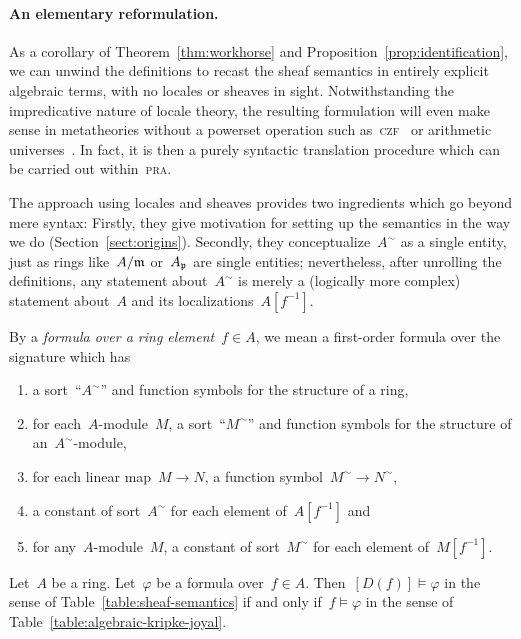 \documentclass{ws-rv9x6}
\begin{document}
{\paragraph{An elementary reformulation.}
As a corollary of Theorem~\ref{thm:workhorse} and
Proposition~\ref{prop:identification}, we can unwind the definitions to recast
the sheaf semantics in entirely explicit algebraic terms, with no locales or
sheaves in sight. Notwithstanding the impredicative nature of locale theory,
the resulting formulation will even make sense in metatheories without a
powerset operation such as~\textsc{czf}~\cite{crosilla:predicativity,aczel-rathjen:cst} or arithmetic
universes~\cite{maietti:au,vickers:sketches}. In
fact, it is then a purely syntactic translation procedure which can be carried
out within~\textsc{pra}.

The approach using locales and sheaves provides two ingredients which go beyond
mere syntax: Firstly, they give motivation for setting up the semantics in
the way we do (Section~\ref{sect:origins}). Secondly, they
conceptualize~$A^\sim$ as a single entity, just as rings like~$A/\mathfrak{m}$
or~$A_{\mathfrak{p}}$ are single entities; nevertheless, after unrolling the definitions,
any statement about~$A^\sim$ is merely a (logically more complex) statement
about~$A$ and its localizations~$A[f^{-1}]$.

By a \emph{formula over a ring element}~$f \in A$, we mean a
first-order formula over the signature which has
\begin{enumerate}
\item a sort~``$A^\sim$'' and function symbols for the structure of a ring,
\item for each~$A$-module~$M$, a sort~``$M^\sim$'' and function symbols for the
structure of an~$A^\sim$-module,
\item for each linear map~$M \to N$, a function symbol~$M^\sim \to N^\sim$,
\item a constant of sort~$A^\sim$ for each element of~$A[f^{-1}]$ and
\item for any~$A$-module~$M$, a constant of sort~$M^\sim$ for each element of~$M[f^{-1}]$.
\end{enumerate}

\begin{corollary}\label{cor:algebraic-reformulation}
Let~$A$ be a ring. Let~$\varphi$ be a formula over~$f \in A$.
Then~$[D(f)] \models \varphi$ in the sense of Table~\ref{table:sheaf-semantics} if and only
if~$f \models \varphi$ in the sense of Table~\ref{table:algebraic-kripke-joyal}.
\end{corollary}

}
\end{document}
